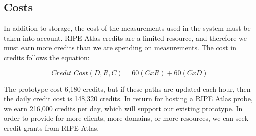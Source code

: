 \subsection{Costs}
In addition to storage, the cost of the measurements used in the system must 
be taken into account.  RIPE Atlas credits are a limited resource, and therefore 
we must earn more credits than we are spending on measurements.  The cost 
in credits follows the equation:

\[Credit\_Cost(D,R,C) = 60(C x R) + 60(C x D)\]

The prototype cost 6,180 credits, but if these paths are updated each hour, then 
the daily credit cost is 148,320 credits.  In return for hosting a RIPE Atlas 
probe, we earn 216,000 credits per day, which will support our existing 
prototype.  In order to provide for more clients, more domains, or more 
resources, we can seek credit grants from RIPE Atlas.
